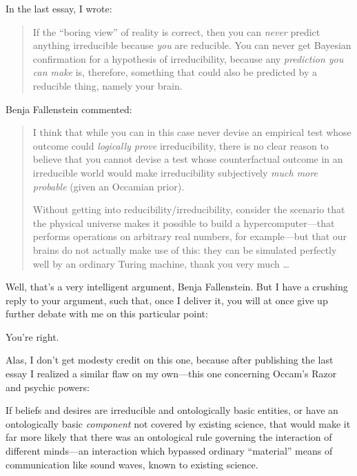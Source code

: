 
{
 In the last essay, I wrote:}

\begin{quote}
{
 If the ``boring view'' of
reality is correct, then you can \textit{never} predict anything
irreducible because \textit{you} are reducible. You can never get
Bayesian confirmation for a hypothesis of irreducibility, because any
\textit{prediction you can make} is, therefore, something that could
also be predicted by a reducible thing, namely your brain.}
\end{quote}

{
 Benja Fallenstein commented:}

\begin{quotation}
{
 I think that while you can in this case never devise an empirical
test whose outcome could \textit{logically prove} irreducibility, there
is no clear reason to believe that you cannot devise a test whose
counterfactual outcome in an irreducible world would make
irreducibility subjectively \textit{much more probable} (given an
Occamian prior).}

{
 Without getting into reducibility/irreducibility, consider the
scenario that the physical universe makes it possible to build a
hypercomputer---that performs operations on arbitrary real numbers, for
example---but that our brains do not actually make use of this: they
can be simulated perfectly well by an ordinary Turing machine, thank
you very much \ldots}
\end{quotation}

{
 Well, that's a very intelligent argument, Benja
Fallenstein. But I have a crushing reply to your argument, such that,
once I deliver it, you will at once give up further debate with me on
this particular point:}

{
 You're right.}

{
 Alas, I don't get modesty credit on this one,
because after publishing the last essay I realized a similar flaw on my
own---this one concerning Occam's Razor and psychic
powers:}

{
 If beliefs and desires are irreducible and ontologically basic
entities, or have an ontologically basic \textit{component} not covered
by existing science, that would make it far more likely that there was
an ontological rule governing the interaction of different minds---an
interaction which bypassed ordinary
``material'' means of communication
like sound waves, known to existing science.}

